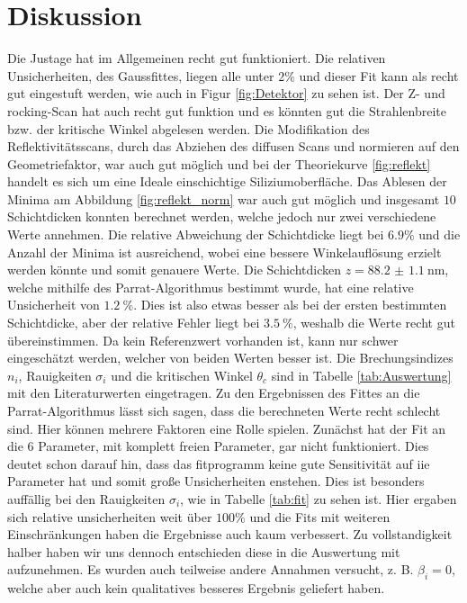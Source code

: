 \section{Diskussion}
Die Justage hat im Allgemeinen recht gut funktioniert. Die relativen Unsicherheiten, des Gaussfittes, liegen alle unter $ 2\%$ und dieser Fit kann als recht gut eingestuft werden, wie auch in Figur \ref{fig:Detektor} zu sehen ist.
Der Z- und rocking-Scan hat auch recht gut funktion und es könnten gut die Strahlenbreite bzw. der kritische Winkel abgelesen werden.
Die Modifikation des Reflektivitätsscans, durch das Abziehen des diffusen Scans und normieren auf den Geometriefaktor, war auch gut möglich und bei der Theoriekurve \ref{fig:reflekt} handelt es sich um eine Ideale einschichtige Siliziumoberfläche.
Das Ablesen der Minima am Abbildung \ref{fig:reflekt_norm} war auch gut möglich und insgesamt $10$ Schichtdicken konnten berechnet werden, welche jedoch nur zwei verschiedene Werte annehmen. 
Die relative Abweichung der Schichtdicke liegt bei $6.9\%$ und die Anzahl der Minima ist ausreichend, wobei eine bessere Winkelauflösung erzielt werden könnte und somit genauere Werte.
Die Schichtdicken $z = \SI{88.2(11)}{\nm}$, welche mithilfe des Parrat-Algorithmus bestimmt wurde, hat eine relative Unsicherheit von $\SI{1.2}{\percent}$. Dies ist also etwas besser als bei der ersten bestimmten Schichtdicke, aber der relative Fehler liegt bei $\SI{3.5}{\percent}$, weshalb die Werte recht gut übereinstimmen.
Da kein Referenzwert vorhanden ist, kann nur schwer eingeschätzt werden, welcher von beiden Werten besser ist. 
Die Brechungsindizes $n_i$, Rauigkeiten $\sigma_i$ und die kritischen Winkel $\theta_c$ sind in Tabelle \ref{tab:Auswertung} mit den Literaturwerten eingetragen.
Zu den Ergebnissen des Fittes an die Parrat-Algorithmus lässt sich sagen, dass die berechneten Werte recht schlecht sind. Hier können mehrere Faktoren eine Rolle spielen. Zunächst hat der Fit an die $6$ Parameter, mit komplett freien Parameter, gar nicht funktioniert. Dies deutet schon darauf hin, dass das fitprogramm keine gute Sensitivität auf iie Parameter hat und somit große Unsicherheiten enstehen.
Dies ist besonders auffällig bei den Rauigkeiten $\sigma_i$, wie in Tabelle \ref{tab:fit} zu sehen ist. Hier ergaben sich relative unsicherheiten weit über $100\%$ und die Fits mit weiteren Einschränkungen haben die Ergebnisse auch kaum verbessert. Zu vollstandigkeit halber haben wir uns dennoch entschieden diese in die Auswertung mit aufzunehmen. Es wurden auch teilweise andere Annahmen versucht, z. B. $\beta_i = 0$, welche aber auch kein qualitatives besseres Ergebnis geliefert haben.
